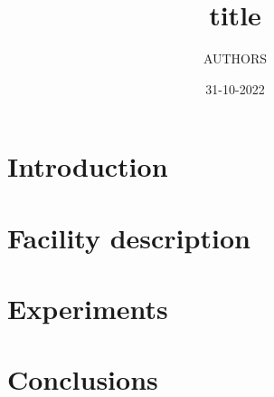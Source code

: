 \documentclass{style/accnote}
\title{title}
\author{AUTHORS}
\institute{CERN, Geneva, Switzerland}
\date{31-10-2022}
\begin{document}
    
    
    \section{Introduction}
    
        
        
    \section{Facility description}
    
        
    \section{Experiments}
    
    
    \section{Conclusions}

    
    \renewcommand{\bibname}{References}
        \printbibliography

    \begin{appendices}
    
    \end{appendices}
\end{document}
